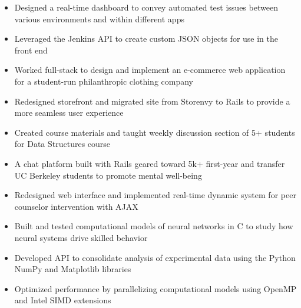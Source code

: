 \documentclass{resume}
\begin{document}
\begin{itemize}
\item Designed a real-time dashboard to convey automated test issues between various environments and within different apps
\item Leveraged the Jenkins API to create custom JSON objects for use in the front end
\end{itemize}
\begin{itemize}
\item Worked full-stack to design and implement an e-commerce web application for a student-run philanthropic clothing company
\item Redesigned storefront and migrated site from Storenvy to Rails to provide a more seamless user experience
\end{itemize}
\begin{itemize}
\item Created course materials and taught weekly discussion section of 5+ students for Data Structures course
\end{itemize}
\begin{itemize}
\item A chat platform built with Rails geared toward 5k+ first-year and transfer UC Berkeley students to promote mental well-being
\item Redesigned web interface and implemented real-time dynamic system for peer counselor intervention with AJAX
\end{itemize}


\begin{itemize}
\item Built and tested computational models of neural networks in C to study how neural systems drive skilled behavior
\item Developed API to consolidate analysis of experimental data using the Python NumPy and Matplotlib libraries
\item Optimized performance by parallelizing computational models using OpenMP and Intel SIMD extensions
\end{itemize}
\end{document}
